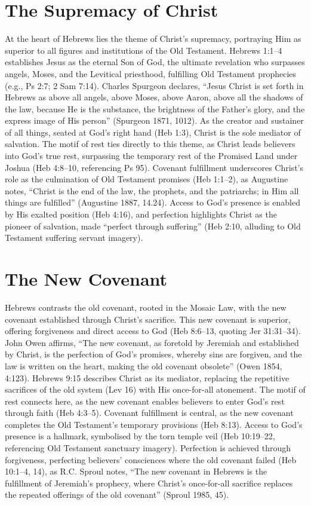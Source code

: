 \documentclass[12pt]{article}
\begin{document}
\section{The Supremacy of Christ}
At the heart of Hebrews lies the theme of Christ’s supremacy, portraying Him as
superior to all figures and institutions of the Old Testament. Hebrews 1:1--4
establishes Jesus as the eternal Son of God, the ultimate revelation who
surpasses angels, Moses, and the Levitical priesthood, fulfilling Old Testament
prophecies (e.g., Ps 2:7; 2 Sam 7:14). Charles Spurgeon declares, ``Jesus
Christ is set forth in Hebrews as above all angels, above Moses, above Aaron,
above all the shadows of the law, because He is the substance, the brightness
of the Father’s glory, and the express image of His person'' (Spurgeon 1871,
1012). As the creator and sustainer of all things, seated at God’s right hand
(Heb 1:3), Christ is the sole mediator of salvation. The motif of rest ties
directly to this theme, as Christ leads believers into God’s true rest,
surpassing the temporary rest of the Promised Land under Joshua (Heb 4:8--10,
referencing Ps 95). Covenant fulfillment underscores Christ’s role as the
culmination of Old Testament promises (Heb 1:1--2), as Augustine notes,
``Christ is the end of the law, the prophets, and the patriarchs; in Him all
things are fulfilled'' (Augustine 1887, 14.24). Access to God’s presence is
enabled by His exalted position (Heb 4:16), and perfection highlights Christ as
the pioneer of salvation, made ``perfect through suffering'' (Heb 2:10,
alluding to Old Testament suffering servant imagery).

\section{The New Covenant}
Hebrews contrasts the old covenant, rooted in the Mosaic Law, with the new
covenant established through Christ’s sacrifice. This new covenant is superior,
offering forgiveness and direct access to God (Heb 8:6--13, quoting Jer
31:31--34). John Owen affirms, ``The new covenant, as foretold by Jeremiah and
established by Christ, is the perfection of God’s promises, whereby sins are
forgiven, and the law is written on the heart, making the old covenant
obsolete'' (Owen 1854, 4:123). Hebrews 9:15 describes Christ as its mediator,
replacing the repetitive sacrifices of the old system (Lev 16) with His
once-for-all atonement. The motif of rest connects here, as the new covenant
enables believers to enter God’s rest through faith (Heb 4:3--5). Covenant
fulfillment is central, as the new covenant completes the Old Testament’s
temporary provisions (Heb 8:13). Access to God’s presence is a hallmark,
symbolised by the torn temple veil (Heb 10:19--22, referencing Old Testament
sanctuary imagery). Perfection is achieved through forgiveness, perfecting
believers’ consciences where the old covenant failed (Heb 10:1--4, 14), as R.C.
Sproul notes, ``The new covenant in Hebrews is the fulfillment of Jeremiah’s
prophecy, where Christ’s once-for-all sacrifice replaces the repeated offerings
of the old covenant'' (Sproul 1985, 45).
\end{document}
